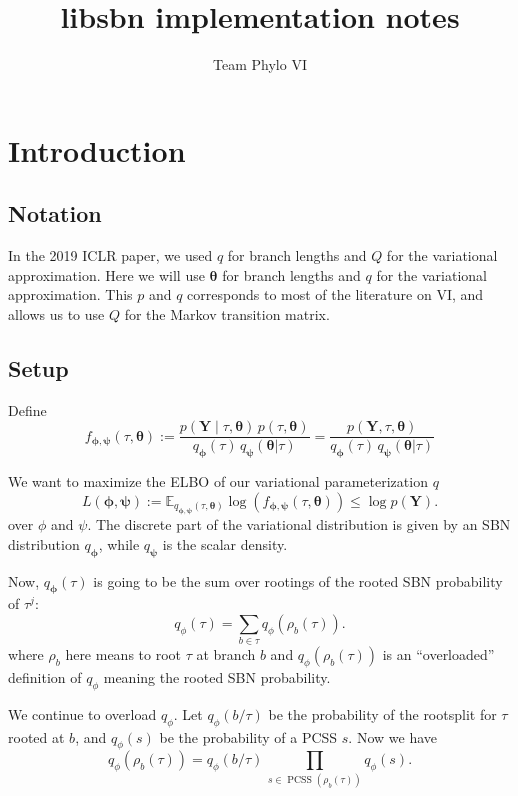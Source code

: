 \documentclass{article}
\title{libsbn implementation notes}
\author{Team Phylo VI}
\newcommand{\PCSS}{\operatorname{PCSS}}
\begin{document}
\maketitle


\section*{Introduction}

\subsection*{Notation}

In the 2019 ICLR paper, we used $q$ for branch lengths and $Q$ for the variational approximation.
Here we will use $\bm \theta$ for branch lengths and $q$ for the variational approximation.
This $p$ and $q$ corresponds to most of the literature on VI, and allows us to use $Q$ for the Markov transition matrix.


\subsection*{Setup}

Define
\[
    f_{\bm{\phi},{\bm{\psi}}}(\tau, \bm \theta) :=
    \frac{p(\bm{Y} \mid \tau, \bm{\theta}) \, p(\tau, \bm{\theta})}
    {q_{\bm{\phi}}(\tau)\, q_{\bm{\psi}}(\bm{\theta}|\tau)}
    = \frac{p(\bm{Y}, \tau, \bm{\theta})}
    {q_{\bm{\phi}}(\tau)\, q_{\bm{\psi}}(\bm{\theta}|\tau)}
\]

We want to maximize the ELBO of our variational parameterization $q$
\[
L(\bm{\phi},{\bm{\psi}}) :=
\mathbb{E}_{q_{\bm{\phi},{\bm{\psi}}}(\tau, \bm{\theta})}
\log\left( f_{\bm{\phi},{\bm{\psi}}}(\tau, \bm \theta) \right) \leq \log p(\bm{Y}).
\]
over $\phi$ and $\psi$.
The discrete part of the variational distribution is given by an SBN distribution $q_{\bm\phi}$, while $q_{\bm\psi}$ is the scalar density.

Now, $q_{\bm{\phi}}(\tau)$ is going to be the sum over rootings of the rooted SBN probability of $\tau^j$:
\[
    q_\phi(\tau) = \sum_{b \in \tau} q_\phi(\rho_b(\tau)).
\]
where $\rho_b$ here means to root $\tau$ at branch $b$ and $q_\phi(\rho_b(\tau))$ is an ``overloaded'' definition of $q_\phi$ meaning the rooted SBN probability.

We continue to overload $q_\phi$.
Let $q_\phi(b \slash \tau)$ be the probability of the rootsplit for $\tau$ rooted at $b$, and
$q_\phi(s)$ be the probability of a PCSS $s$.
Now we have
\begin{equation}
    q_\phi(\rho_b(\tau)) = q_\phi(b \slash \tau) \, \prod_{s \in \PCSS(\rho_b(\tau))} q_\phi(s).
    \label{eq:qRooted}
\end{equation}
\end{document}
